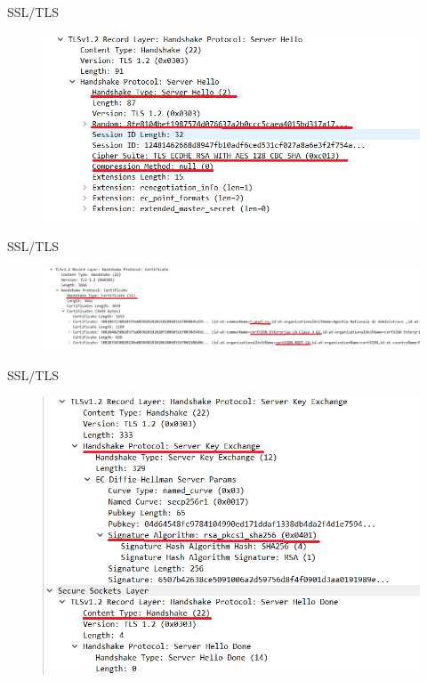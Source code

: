 \documentclass[pdf]{beamer}
\begin{document}
\begin{frame}{SSL/TLS}

\begin{figure}[t]
\centering
\includegraphics[scale=0.7]{Images/tls2}
\end{figure}

\end{frame}



\begin{frame}{SSL/TLS}

\begin{figure}[t]
\centering
\includegraphics[scale=0.5]{Images/tls3}
\end{figure}

\end{frame}



\begin{frame}{SSL/TLS}

\begin{figure}[t]
\centering
\includegraphics[scale=0.6]{Images/tls4}
\end{figure}

\end{frame}
\end{document}
